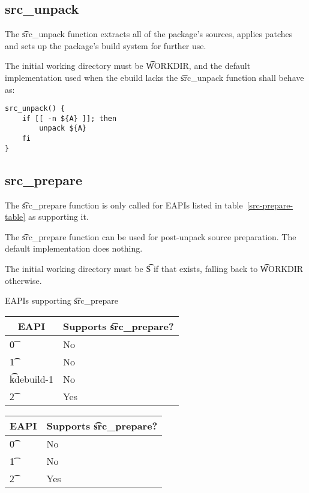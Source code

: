 \subsection{src\_unpack}
\label{src-unpack-function}

The \t{src\_unpack} function extracts all of the package's sources, applies patches and sets up the
package's build system for further use.

The initial working directory must be \t{WORKDIR}, and the default implementation used when
the ebuild lacks the \t{src\_unpack} function shall behave as:

\begin{verbatim}
src_unpack() {
    if [[ -n ${A} ]]; then
        unpack ${A}
    fi
}
\end{verbatim}

\subsection{src\_prepare}
\label{src-prepare-function}

The \t{src\_prepare} function is only called for EAPIs listed in table~\ref{src-prepare-table} as
supporting it.

The \t{src\_prepare} function can be used for post-unpack source preparation. The default
implementation does nothing.

The initial working directory must be \t{S} if that exists, falling back to \t{WORKDIR} otherwise.

\begin{centertable}{EAPIs supporting \t{src\_prepare}} \label{src-prepare-table}
\IFKDEBUILDELSE
{
    \begin{tabular}{ l l }
        \toprule
        \multicolumn{1}{c}{\textbf{EAPI}} &
        \multicolumn{1}{c}{\textbf{Supports \t{src\_prepare}?}} \\
        \midrule
    \t{0} & No \\
    \t{1} & No \\
    \t{kdebuild-1} & No \\
    \t{2} & Yes \\
    \bottomrule
    \end{tabular}
}{
    \begin{tabular}{ l l }
        \toprule
        \multicolumn{1}{c}{\textbf{EAPI}} &
        \multicolumn{1}{c}{\textbf{Supports \t{src\_prepare}?}} \\
        \midrule
    \t{0} & No \\
    \t{1} & No \\
    \t{2} & Yes \\
    \bottomrule
    \end{tabular}
}
\end{centertable}

